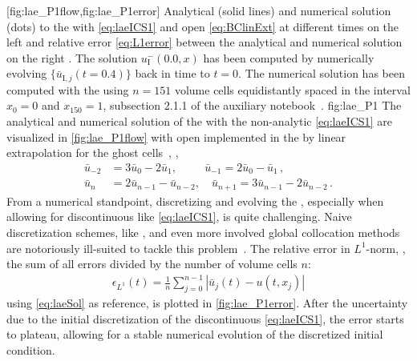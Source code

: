 	[fig:lae_P1flow,fig:lae_P1error]%
	{%
	Analytical (solid lines) and numerical solution (dots) to the \laeq{} with \ic{} \eqref{eq:laeICS1} and open \bc{} \eqref{eq:BClinExt} at different times on the left  and relative error \eqref{eq:L1error} between the analytical and numerical solution on the right .
	The solution $u_{\mathrm{I}}^-(0.0,x)$ has been computed by numerically evolving $\{\bar{u}_{\mathrm{I},j}(t=0.4)\}$ back in time to $t=0$.
	The numerical solution has been computed with the \ktScheme{} using $n=151$ volume cells equidistantly spaced in the interval $x_0=0$ and $x_{150}=1$, \cf{} subsection 2.1.1 of the auxiliary notebook~\cite{Steil:2023PhDFVNB}.
	}%
	{fig:lae_P1}%
The analytical and numerical solution of the \laeq{} with the non-analytic \ic{} \eqref{eq:laeICS1} are visualized in \cref{fig:lae_P1flow} with open \bcs{} implemented in the \ktScheme{} by linear extrapolation for the ghost cells~\cite{LeVeque:1992,LeVeque:2002,Vazquez-Cendon2015}, \ie{},
\begin{subequations}\label{eq:BClinExt}
\begin{align}
	\bar{u}_{-2}&=3\bar{u}_0-2\bar{u}_1,\quad\quad\ \ \bar{u}_{-1}=2\bar{u}_0-\bar{u}_1\,,\\
	\bar{u}_{n}&=2\bar{u}_{n-1}-\bar{u}_{n-2},\quad\bar{u}_{n+1}=3\bar{u}_{n-1} -2\bar{u}_{n-2}\,.
\end{align}
\end{subequations}
From a numerical standpoint, discretizing and evolving the \laeq{}, especially when allowing for discontinuous \ic{} like \cref{eq:laeICS1}, is quite challenging.
Naive discretization schemes, like \fds{}, and even more involved global collocation methods are notoriously ill-suited to tackle this problem~\cite{Bernstein1951Jan,LeVeque:1992,LeVeque:2002,Hesthaven2007,Vazquez-Cendon2015,polyanin2016handbook}.
The relative error in $L^1$-norm, \ie{}, the sum of all errors divided by the number of volume cells $n$:
\begin{align}
	\epsilon_{L^1}(t)=\frac{1}{n}\sum_{j=0}^{n-1}|\bar{u}_j(t)-u(t,x_j)|	\label{eq:L1error}
\end{align}
using \cref{eq:laeSol} as reference, is plotted in \cref{fig:lae_P1error}.
After the uncertainty due to the initial discretization of the discontinuous \ic{} \eqref{eq:laeICS1}, the error starts to plateau, allowing for a stable numerical evolution of the discretized initial condition.

